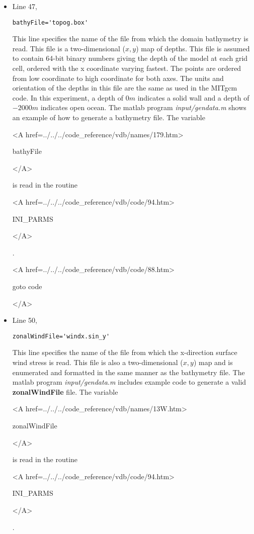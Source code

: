 \begin{itemize}
\item Line 47,
\begin{verbatim}
bathyFile='topog.box'
\end{verbatim}
This line specifies the name of the file from which the domain
bathymetry is read. This file is a two-dimensional ($x,y$) map of
depths. This file is assumed to contain 64-bit binary numbers 
giving the depth of the model at each grid cell, ordered with the x 
coordinate varying fastest. The points are ordered from low coordinate
to high coordinate for both axes. The units and orientation of the
depths in this file are the same as used in the MITgcm code. In this
experiment, a depth of $0m$ indicates a solid wall and a depth
of $-2000m$ indicates open ocean. The matlab program
{\it input/gendata.m} shows an example of how to generate a
bathymetry file.
The variable
{\bf
\begin{rawhtml} <A href=../../../code_reference/vdb/names/179.htm> \end{rawhtml}
bathyFile
\begin{rawhtml} </A>\end{rawhtml}
}
is read in the routine
{\it
\begin{rawhtml} <A href=../../../code_reference/vdb/code/94.htm> \end{rawhtml}
INI\_PARMS
\begin{rawhtml} </A>\end{rawhtml}
}.

{\bf
\begin{rawhtml} <A href=../../../code_reference/vdb/code/88.htm> \end{rawhtml}
goto code
\begin{rawhtml} </A>\end{rawhtml}
}


\item Line 50,
\begin{verbatim}
zonalWindFile='windx.sin_y'
\end{verbatim}
This line specifies the name of the file from which the x-direction
surface wind stress is read. This file is also a two-dimensional
($x,y$) map and is enumerated and formatted in the same manner as the 
bathymetry file. The matlab program {\it input/gendata.m} includes example 
code to generate a valid 
{\bf zonalWindFile} 
file.  
The variable
{\bf
\begin{rawhtml} <A href=../../../code_reference/vdb/names/13W.htm> \end{rawhtml}
zonalWindFile
\begin{rawhtml} </A>\end{rawhtml}
}
is read in the routine
{\it
\begin{rawhtml} <A href=../../../code_reference/vdb/code/94.htm> \end{rawhtml}
INI\_PARMS
\begin{rawhtml} </A>\end{rawhtml}
}.


\end{itemize}
